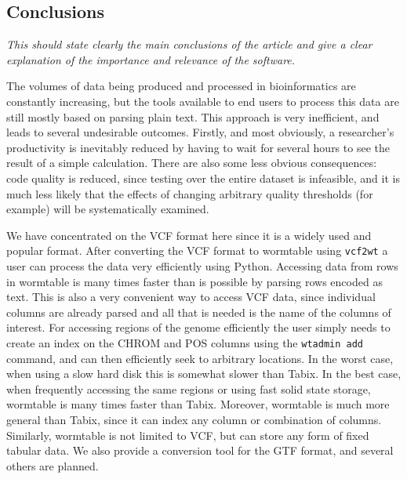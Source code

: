 \documentclass[10pt]{bmc_article}
\newenvironment{bmcformat}{\begin{raggedright}\baselineskip20pt\sloppy\setboolean{publ}{false}}{\end{raggedright}\baselineskip20pt\sloppy}
\begin{document}
\begin{bmcformat}
\section*{Conclusions}
\emph{This should state clearly the main conclusions of the article and give a clear 
explanation of the importance and relevance of the software.}

The volumes of data being produced and processed in bioinformatics are constantly 
increasing, but the tools available to end users to 
process this data are still mostly based on parsing plain text. This 
approach is very inefficient, and leads to several undesirable outcomes.
Firstly, and most obviously, a researcher's productivity is inevitably
reduced by having to wait for several hours to see the result of a 
simple calculation. There are also some less obvious consequences:
code quality is reduced, since testing over the entire dataset is 
infeasible, and it is much less likely that the effects of 
changing arbitrary quality thresholds (for example) will be 
systematically examined.

We have concentrated on the VCF format here since it is a widely 
used and popular format. After converting the VCF format to 
wormtable using \texttt{vcf2wt} a user can process the 
data very efficiently using Python. Accessing data from 
rows in wormtable is many times faster than is possible 
by parsing rows encoded as text.
This is also a very convenient 
way to access VCF data, since individual columns are already 
parsed and all that is needed is the name of the columns of 
interest. For accessing regions of the genome efficiently
the user simply needs to create an index on the CHROM and POS columns
using the  \texttt{wtadmin add} command, and can then efficiently
seek to arbitrary locations. In the worst case, when using a 
slow hard disk this is somewhat slower than Tabix. In the best
case, when frequently accessing the same regions or using 
fast solid state storage, wormtable is many times faster than 
Tabix. Moreover, wormtable is much more general than Tabix, 
since it can index any column or combination of columns.
Similarly, wormtable is not limited to VCF, but can store
any form of fixed tabular data. We also provide a conversion 
tool for the GTF format, and several others are planned.


\end{bmcformat}
\end{document}
